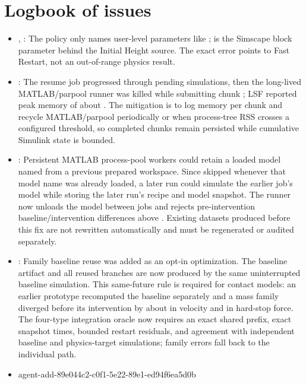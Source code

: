 \documentclass[11pt]{article}
\begin{document}
\section*{Logbook of issues}
\begin{itemize}
\item {}, : The policy only names user-level parameters like ;  is the Simscape block parameter behind the Initial Height source. The exact error points to Fast Restart, not an out-of-range physics result.
\item {}: The  resume job progressed through  pending  simulations, then the long-lived MATLAB/parpool runner was killed while submitting chunk ; LSF
  reported peak memory of about . The mitigation is to log memory per chunk and recycle MATLAB/parpool periodically or when process-tree RSS crosses a configured threshold, so completed chunks remain persisted while cumulative Simulink state is
  bounded.
\item {}: Persistent MATLAB process-pool workers could retain a loaded model named  from a previous prepared workspace. Since  skipped  whenever that model name was already loaded, a later run could simulate the earlier job's model while storing the later run's recipe and model snapshot. The runner now unloads the model between jobs and rejects pre-intervention baseline/intervention differences above . Existing datasets produced before this fix are not rewritten automatically and must be regenerated or audited separately.
\item {}: Family baseline reuse was added as an opt-in optimization. The baseline artifact and all reused branches are
now produced by the same uninterrupted baseline simulation. This same-future rule is required for contact models: an earlier
prototype recomputed the baseline separately and a mass family diverged before its intervention by about  in velocity
and  in hard-stop force. The four-type integration oracle now requires an exact shared prefix, exact snapshot times,
bounded restart residuals, and agreement with independent baseline and physics-target simulations; family errors fall back to the
individual path.
\item \agentProposedEdit
  {agent-add-89e044c2-c0f1-5e22-89e1-ed94f6ea5d0b}

\end{itemize}
\end{document}
